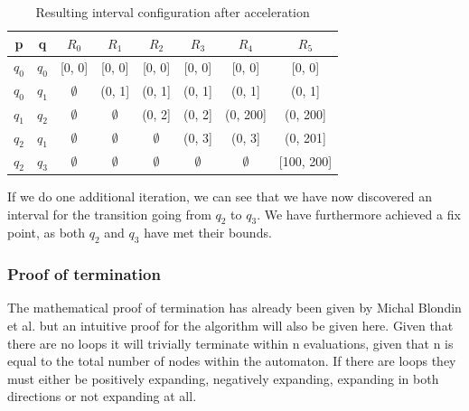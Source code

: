 \documentclass[12pt]{article}
\begin{document}
\begin{table}[t!]
	\begin{tabular}{ |c|c|c|c|c|c|c|c| }
		\hline
		p		& q 	& $R_0$ 		& $R_1$			& $R_2$			& $R_3$			& $R_4$ 		& $R_5$ \\
		\hline
		$q_0$	& $q_0$ & [0, 0] 		& [0, 0] 		& [0, 0] 		& [0, 0]		& [0, 0]		& [0, 0] \\
		$q_0$	& $q_1$ & $\emptyset$ 	& (0, 1]		& (0, 1] 		& (0, 1]		& (0, 1] 		& (0, 1] \\
		$q_1$	& $q_2$ & $\emptyset$ 	& $\emptyset$ 	& (0, 2] 		& (0, 2]		& (0, 200] 		& (0, 200] \\
		$q_2$	& $q_1$ & $\emptyset$ 	& $\emptyset$ 	& $\emptyset$	& (0, 3]		& (0, 3] 		& (0, 201] \\
		$q_2$	& $q_3$ & $\emptyset$ 	& $\emptyset$ 	& $\emptyset$	& $\emptyset$	& $\emptyset$	& [100, 200] \\
		\hline
	\end{tabular}
	\centering
	\caption{Resulting interval configuration after acceleration}
	\label{table:table_example_acc}
\end{table}

If we do one additional iteration, we can see that we have now discovered an interval for the transition going from $q_2$ to $q_3$. We have furthermore achieved a fix point, as both $q_2$ and $q_3$ have met their bounds.

\subsubsection{Proof of termination}
The mathematical proof of termination has already been given by Michal Blondin et al. \cite{blondin2021continuous} but an intuitive proof for the algorithm will also be given here. Given that there are no loops it will trivially terminate within n evaluations, given that n is equal to the total number of nodes within the automaton. If there are loops they must either be positively expanding, negatively expanding, expanding in both directions or not expanding at all. 
\end{document}
